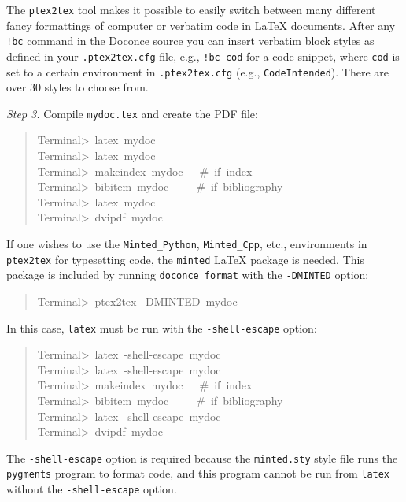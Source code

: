 \documentclass[a4paper]{article}
\begin{document}
The \texttt{ptex2tex} tool makes it possible to easily switch between many
different fancy formattings of computer or verbatim code in LaTeX
documents. After any \texttt{!bc} command in the Doconce source you can
insert verbatim block styles as defined in your \texttt{.ptex2tex.cfg}
file, e.g., \texttt{!bc cod} for a code snippet, where \texttt{cod} is set to
a certain environment in \texttt{.ptex2tex.cfg} (e.g., \texttt{CodeIntended}).
There are over 30 styles to choose from.

\emph{Step 3.} Compile \texttt{mydoc.tex}
and create the PDF file:
%
\begin{quote}{\ttfamily \raggedright \noindent
Terminal>~latex~mydoc\\
Terminal>~latex~mydoc\\
Terminal>~makeindex~mydoc~~~\#~if~index\\
Terminal>~bibitem~mydoc~~~~~\#~if~bibliography\\
Terminal>~latex~mydoc\\
Terminal>~dvipdf~mydoc
}
\end{quote}

If one wishes to use the \texttt{Minted\_Python}, \texttt{Minted\_Cpp}, etc., environments
in \texttt{ptex2tex} for typesetting code, the \texttt{minted} LaTeX package is needed.
This package is included by running \texttt{doconce format} with the
\texttt{-DMINTED} option:
%
\begin{quote}{\ttfamily \raggedright \noindent
Terminal>~ptex2tex~-DMINTED~mydoc
}
\end{quote}

In this case, \texttt{latex} must be run with the
\texttt{-shell-escape} option:
%
\begin{quote}{\ttfamily \raggedright \noindent
Terminal>~latex~-shell-escape~mydoc\\
Terminal>~latex~-shell-escape~mydoc\\
Terminal>~makeindex~mydoc~~~\#~if~index\\
Terminal>~bibitem~mydoc~~~~~\#~if~bibliography\\
Terminal>~latex~-shell-escape~mydoc\\
Terminal>~dvipdf~mydoc
}
\end{quote}

The \texttt{-shell-escape} option is required because the \texttt{minted.sty} style
file runs the \texttt{pygments} program to format code, and this program
cannot be run from \texttt{latex} without the \texttt{-shell-escape} option.
\end{document}
